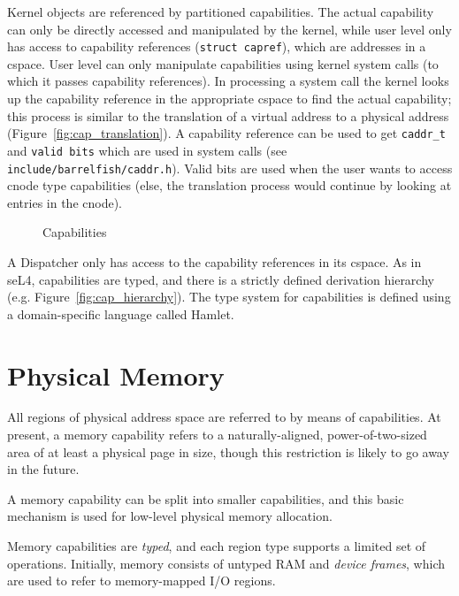 \documentclass[a4paper,twoside]{report} %
\begin{document}
Kernel objects are referenced by partitioned capabilities. The actual
capability can only be directly accessed and manipulated by the
kernel, while user level only has access to capability references
(\texttt{struct capref}), which are addresses in a cspace. User level
can only manipulate capabilities using kernel system calls (to which
it passes capability references). In processing a system call the 
kernel looks up the capability reference in the appropriate cspace to find the
actual capability; this process is similar to the translation of a virtual
address to a physical address (Figure~\ref{fig:cap_translation}). A capability
reference can be used to get \texttt{caddr\_t} and \texttt{valid bits} which are
used in system calls (see \texttt{include/barrelfish/caddr.h}).  Valid bits are
used when the user wants to access cnode type capabilities (else, the
translation process would continue by looking at entries in the cnode).
 
\begin{figure}
  \centering
  \quad
  \caption{Capabilities}
  \label{fig:caps}
\end{figure}

A Dispatcher only has access to the capability references in its cspace. As in
seL4, capabilities are typed, and there is a strictly defined derivation
hierarchy (e.g. Figure~\ref{fig:cap_hierarchy}).  The type system for
capabilities is defined using a domain-specific language called
Hamlet. 

\section{Physical Memory}

All regions of physical address space are referred to by means of
capabilities.  At present, a memory capability refers to a
naturally-aligned, power-of-two-sized area of at least a physical page
in size, though this restriction is likely to go away in the future. 

A memory capability can be split into smaller capabilities, and this
basic mechanism is used for low-level physical memory allocation. 

Memory capabilities are \emph{typed}, and each region type supports a
limited set of operations.  Initially, memory consists of untyped RAM
and \emph{device frames}, which are used to refer to memory-mapped I/O
regions. 
\end{document}
